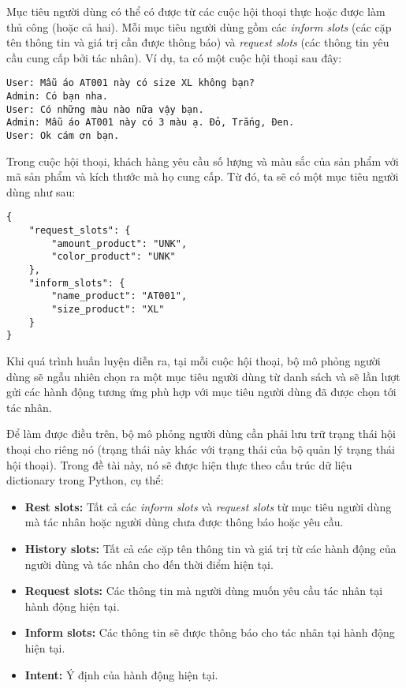 Mục tiêu người dùng có thể có được từ các cuộc hội thoại thực hoặc được làm thủ công (hoặc cả hai). Mỗi mục tiêu người dùng gồm các \textit{inform slots} (các cặp tên thông tin và giá trị cần được thông báo) và \textit{request slots} (các thông tin yêu cầu cung cấp bởi tác nhân). Ví dụ, ta có một cuộc hội thoại sau đây:

\renewcommand{\lstlistingname}{Ví dụ}
\begin{lstlisting}[caption={Một cuộc hội thoại tư vấn},label={exam:examdialog},language=exam_vn,firstnumber=1]
User: Mẫu áo AT001 này có size XL không bạn?
Admin: Có bạn nha. 
User: Có những màu nào nữa vậy bạn.
Admin: Mẫu áo AT001 này có 3 màu ạ. Đỏ, Trắng, Đen.
User: Ok cám ơn bạn.
\end{lstlisting}

Trong cuộc hội thoại, khách hàng yêu cầu số lượng và màu sắc của sản phẩm với mã sản phẩm và kích thước mà họ cung cấp. Từ đó, ta sẽ có một mục tiêu người dùng như sau:

\renewcommand{\lstlistingname}{Ví dụ}
\begin{lstlisting}[caption={Một mục tiêu người dùng},label={exam:examgoal},language=code_vn,firstnumber=1]
{
    "request_slots": {
    	"amount_product": "UNK",
    	"color_product": "UNK"
    },
    "inform_slots": {
    	"name_product": "AT001",
    	"size_product": "XL"
    }
}
\end{lstlisting}

Khi quá trình huấn luyện diễn ra, tại mỗi cuộc hội thoại, bộ mô phỏng người dùng sẽ ngẫu nhiên chọn ra một mục tiêu người dùng từ danh sách và sẽ lần lượt gửi các hành động tương ứng phù hợp với mục tiêu người dùng đã được chọn tới tác nhân.

Để làm được điều trên, bộ mô phỏng người dùng cần phải lưu trữ trạng thái hội thoại cho riêng nó (trạng thái này khác với trạng thái của bộ quản lý trạng thái hội thoại). Trong đề tài này, nó sẽ được hiện thực theo cấu trúc dữ liệu dictionary trong Python, cụ thể:

\begin{itemize}
    \item \textbf{Rest slots:} Tất cả các \textit{inform slots} và \textit{request slots} từ mục tiêu người dùng mà tác nhân hoặc người dùng chưa được thông báo hoặc yêu cầu.
    \item \textbf{History slots:} Tất cả các cặp tên thông tin và giá trị từ các hành động của người dùng và tác nhân cho đến thời điểm hiện tại.
    \item \textbf{Request slots:} Các thông tin mà người dùng muốn yêu cầu tác nhân tại hành động hiện tại.
    \item \textbf{Inform slots:} Các thông tin sẽ được thông báo cho tác nhân tại hành động hiện tại.
    \item \textbf{Intent:} Ý định của hành động hiện tại.
\end{itemize}

